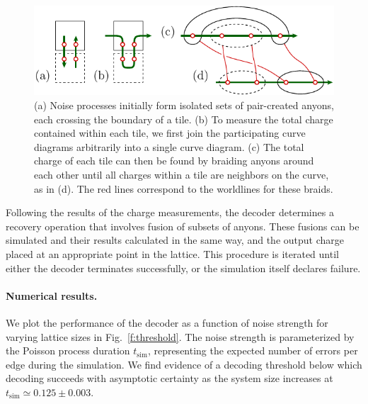 \documentclass[aps, prl, letterpaper, twocolumn, superscriptaddress, notitlepage, 10pt]{revtex4-1}
\newcommand{\Fref}[1]{Fig.~\ref{#1}}
\begin{document}
\begin{figure}[t!]
\begin{center}
	\includegraphics[width=1.0\columnwidth]{pic-syndrome.pdf}
\caption{
(a) Noise processes initially form isolated sets of pair-created anyons, 
each crossing the boundary of a tile. 
(b) To measure the total charge 
contained within each tile, 
we first join the participating curve 
diagrams arbitrarily into a single curve diagram.
(c) The total charge of each tile can then be found 
by braiding anyons around each other until all charges within 
a tile are neighbors on the curve, as in (d).  
The red lines correspond to the worldlines for these braids.
}
\label{f:syndrome}
\end{center}
\vspace{-10pt}
\end{figure}

Following the results of the charge measurements, the decoder determines 
a recovery operation that involves fusion of subsets of anyons. 
These fusions can be simulated and their results calculated in the same way, 
and the output charge placed at an appropriate point in the lattice. 
This procedure is iterated until either the decoder terminates successfully, 
or the simulation itself declares failure.


\paragraph{Numerical results.}

We plot the performance of the decoder as a function of noise strength for varying lattice sizes in 
\Fref{f:threshold}. 
The noise strength is parameterized by the Poisson process duration $t_{\mathrm{sim}}$, representing the expected number of errors per edge during the simulation. 
We find evidence of a decoding threshold below which decoding succeeds with asymptotic 
certainty as the system size increases at $t_{\mathrm{sim}}\simeq 0.125 \pm 0.003$.
\end{document}

